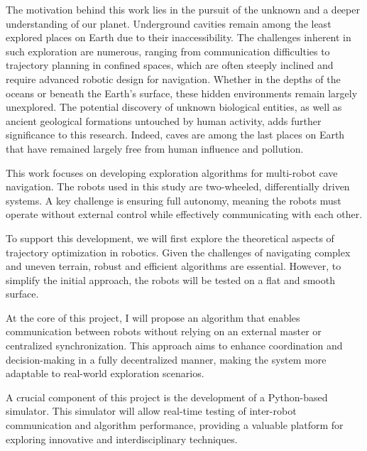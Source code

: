 \documentclass[../main.tex]{subfiles}
\begin{document}
The motivation behind this work lies in the pursuit of the unknown and a deeper understanding of our planet. Underground cavities remain among the least explored places on Earth due to their inaccessibility. The challenges inherent in such exploration are numerous, ranging from communication difficulties to trajectory planning in confined spaces, which are often steeply inclined and require advanced robotic design for navigation. Whether in the depths of the oceans or beneath the Earth's surface, these hidden environments remain largely unexplored. The potential discovery of unknown biological entities, as well as ancient geological formations untouched by human activity, adds further significance to this research. Indeed, caves are among the last places on Earth that have remained largely free from human influence and pollution.

\vspace{1em}

This work focuses on developing exploration algorithms for multi-robot cave navigation. The robots used in this study are two-wheeled, differentially driven systems. A key challenge is ensuring full autonomy, meaning the robots must operate without external control while effectively communicating with each other.

\vspace{0.5em}

To support this development, we will first explore the theoretical aspects of trajectory optimization in robotics. Given the challenges of navigating complex and uneven terrain, robust and efficient algorithms are essential. However, to simplify the initial approach, the robots will be tested on a flat and smooth surface.

\vspace{0.5em}

At the core of this project, I will propose an algorithm that enables communication between robots without relying on an external master or centralized synchronization. This approach aims to enhance coordination and decision-making in a fully decentralized manner, making the system more adaptable to real-world exploration scenarios.

\vspace{0.5em}

A crucial component of this project is the development of a Python-based simulator. This simulator will allow real-time testing of inter-robot communication and algorithm performance, providing a valuable platform for exploring innovative and interdisciplinary techniques.

\vspace{1em}
\end{document}
